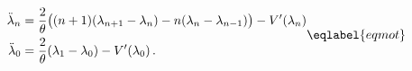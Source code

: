 \begin{equation}
\begin{split}
\ddot\lambda_n & = \frac 2\theta \bigl((n+1)(\lambda_{n+1}-\lambda_n)
- n(\lambda_n - \lambda_{n-1}) \bigr) - V'(\lambda_n) \\
\ddot\lambda_0 & = \frac 2\theta (\lambda_1-\lambda_0) - V'(\lambda_0) \,.
\end{split}
\eqlabel{eqmot}
\end{equation}


